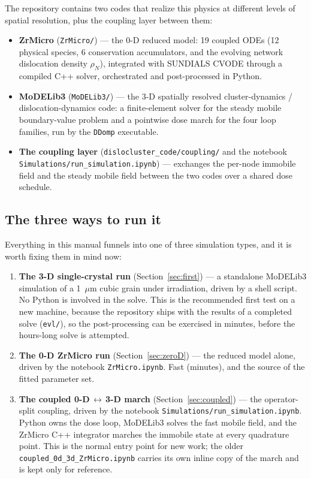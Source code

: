 \documentclass[11pt]{article}
\newcommand{\ZrM}{\textsf{ZrMicro}}
\newcommand{\MoD}{\textsf{MoDELib3}}
\newcommand{\code}[1]{\texttt{\small #1}}
\newcommand{\file}[1]{\texttt{\footnotesize #1}}
\begin{document}
The repository contains two codes that realize this physics at different
levels of spatial resolution, plus the coupling layer between them:

\begin{itemize}
\item \textbf{\ZrM{}} (\file{ZrMicro/}) --- the 0-D reduced
model: 19 coupled ODEs (12 physical species, 6 conservation accumulators, and
the evolving network dislocation density $\rho_N$), integrated with SUNDIALS
CVODE through a compiled C++ solver, orchestrated and post-processed in
Python.
\item \textbf{\MoD{}} (\file{MoDELib3/}) --- the 3-D spatially resolved
cluster-dynamics / dislocation-dynamics code: a finite-element solver for the
steady mobile boundary-value problem and a pointwise dose march for the four
loop families, run by the \code{DDomp} executable.
\item \textbf{The coupling layer} (\file{dislocluster\_code/coupling/} and
the notebook \file{Simulations/run\_simulation.ipynb}) --- exchanges the
per-node immobile field and the steady mobile field between the two codes
over a shared dose schedule.
\end{itemize}

\subsection{The three ways to run it}
\label{sec:threeways}

Everything in this manual funnels into one of three simulation types, and it
is worth fixing them in mind now:

\begin{enumerate}
\item \textbf{The 3-D single-crystal run} (Section~\ref{sec:first}) --- a
standalone \MoD{} simulation of a 1~$\mu$m cubic grain under irradiation,
driven by a shell script. No Python is involved in the solve. This is the
recommended first test on a new machine, because the repository ships with
the results of a completed solve (\file{evl/}), so the post-processing can be
exercised in minutes, before the hours-long solve is attempted.
\item \textbf{The 0-D \ZrM{} run} (Section~\ref{sec:zeroD}) --- the reduced
model alone, driven by the notebook \file{ZrMicro.ipynb}. Fast (minutes), and
the source of the fitted parameter set.
\item \textbf{The coupled 0-D$\,\leftrightarrow\,$3-D march}
(Section~\ref{sec:coupled}) --- the operator-split coupling, driven by the
notebook \file{Simulations/run\_simulation.ipynb}. Python owns the dose loop,
\MoD{} solves the fast mobile field, and the \ZrM{} C++ integrator marches
the immobile state at every quadrature point. This is the normal entry point
for new work; the older \file{coupled\_0d\_3d\_ZrMicro.ipynb} carries its own
inline copy of the march and is kept only for reference.
\end{enumerate}
\end{document}
